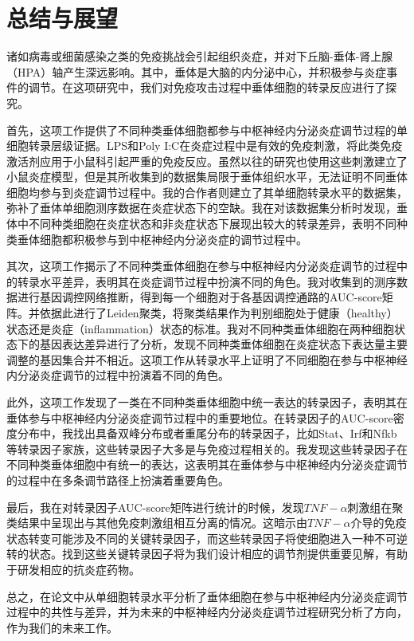 
\chapter{总结与展望}
  诸如病毒或细菌感染之类的免疫挑战会引起组织炎症，并对下丘脑­-垂体­-肾上腺（HPA）轴产生深远影响。其中，垂体是大脑的内分泌中心，并积极参与炎症事件的调节。在这项研究中，我们对免疫攻击过程中垂体细胞的转录反应进行了探究。

  首先，这项工作提供了不同种类垂体细胞都参与中枢神经内分泌炎症调节过程的单细胞转录层级证据。LPS和Poly I:C在炎症过程中是有效的免疫刺激，将此类免疫激活剂应用于小鼠科引起严重的免疫反应。虽然以往的研究也使用这些刺激建立了小鼠炎症模型，但是其所收集到的数据集局限于垂体组织水平，无法证明不同垂体细胞均参与到炎症调节过程中。我的合作者则建立了其单细胞转录水平的数据集，弥补了垂体单细胞测序数据在炎症状态下的空缺。我在对该数据集分析时发现，垂体中不同种类细胞在炎症状态和非炎症状态下展现出较大的转录差异，表明不同种类垂体细胞都积极参与到中枢神经内分泌炎症的调节过程中。

  其次，这项工作揭示了不同种类垂体细胞在参与中枢神经内分泌炎症调节的过程中的转录水平差异，表明其在炎症调节过程中扮演不同的角色。我对收集到的测序数据进行基因调控网络推断，得到每一个细胞对于各基因调控通路的AUC-score矩阵。并依据此进行了Leiden聚类，将聚类结果作为判别细胞处于健康（healthy）状态还是炎症（inflammation）状态的标准。我对不同种类垂体细胞在两种细胞状态下的基因表达差异进行了分析，发现不同种类垂体细胞在炎症状态下表达量主要调整的基因集合并不相近。这项工作从转录水平上证明了不同细胞在参与中枢神经内分泌炎症调节的过程中扮演着不同的角色。

  此外，这项工作发现了一类在不同种类垂体细胞中统一表达的转录因子，表明其在垂体参与中枢神经内分泌炎症调节过程中的重要地位。在转录因子的AUC-score密度分布中，我找出具备双峰分布或者重尾分布的转录因子，比如Stat、Irf和Nfkb等转录因子家族，这些转录因子大多是与免疫过程相关的。我发现这些转录因子在不同种类垂体细胞中有统一的表达，这表明其在垂体参与中枢神经内分泌炎症调节的过程中在多条调节路径上扮演着重要角色。

  最后，我在对转录因子AUC-score矩阵进行统计的时候，发现$TNF-\alpha$刺激组在聚类结果中呈现出与其他免疫刺激组相互分离的情况。这暗示由$TNF-\alpha$介导的免疫状态转变可能涉及不同的关键转录因子，而这些转录因子将使细胞进入一种不可逆转的状态。找到这些关键转录因子将为我们设计相应的调节剂提供重要见解，有助于研发相应的抗炎症药物。

  总之，在论文中从单细胞转录水平分析了垂体细胞在参与中枢神经内分泌炎症调节过程中的共性与差异，并为未来的中枢神经内分泌炎症调节过程研究分析了方向，作为我们的未来工作。

